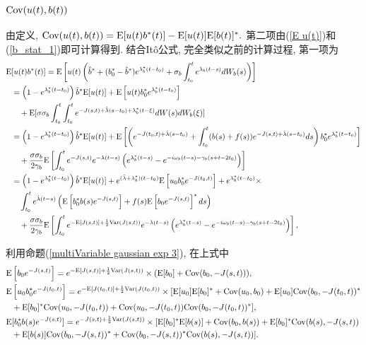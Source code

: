 \documentclass[notitlepage,cs4size,punct,oneside]{ctexrep}
\numberwithin{equation}{section}
\theoremstyle{mystyle}
\begin{document}
\subsubsection{$\text{Cov}(u(t), b(t))$}
由定义,
$
\text{Cov}(u(t), b(t)) = \text{E}[u(t)b^*(t)] - \text{E}[u(t)]\text{E}[b(t)]^*.
$
第二项由(\ref{E u(t)})和(\ref{b_stat_1})即可计算得到. 结合It\^o公式, 完全类似之前的计算过程, 第一项为
\[
\begin{split}
\text{E}&[u(t)b^*(t)] = \text{E}\left[u(t)\left(\hat{b}^*+(b_0^*-\hat{b}^*)e^{\lambda_b^*(t-t_0)}+\sigma_b\int_{t_0}^t e^{\lambda_b(t-s)}dW_b(s)\right)\right] \\
&= \left(1-e^{\lambda_b^*(t-t_0)}\right)\hat{b}^*\text{E}[u(t)] + \text{E}\left[u(t)b_0^*e^{\lambda_b^*(t-t_0)}\right] \\
&\quad + \text{E}[\sigma\sigma_b\int_{t_0}^t\int_{t_0}^te^{-J(s, t)+\hat\lambda(s-t_0)+\lambda_b^*(t-\xi)}dW(s)dW_b(\xi)] \\
&= \left(1-e^{\lambda_b^*(t-t_0)}\right)\hat{b}^*\text{E}[u(t)] + \text{E}\left[\left(e^{-J(t_0, t)+\hat\lambda(s-t_0)}+\int_{t_0}^t (b(s)+f(s))e^{-J(s, t)+\hat\lambda(s-t_0)}ds\right)b_0^*e^{\lambda_b^*(t-t_0)}\right] \\
&\quad + \frac{\sigma\sigma_b}{2\gamma_b}\text{E}\left[\int_{t_0}^t e^{-J(s, t)}e^{-\lambda(t-s)}\left(e^{\lambda_b^*(t-s)}-e^{-i\omega_b(t-s)-\gamma_b(s+t-2t_0)}\right)\right] \\
&= \left(1-e^{\lambda_b^*(t-t_0)}\right)\hat{b}^*\text{E}[u(t)] + e^{(\hat\lambda+\lambda_b^*)(t-t_0)}\text{E}\left[u_0b_0^*e^{-J(t_0, t)}\right] + e^{\lambda_b^*(t-t_0)}\times \\
&\quad \int_{t_0}^t e^{\hat\lambda(t-s)}\left(\text{E}\left[b_0^*b(s)e^{-J(s, t)}\right]+f(s)\text{E}\left[b_0e^{-J(s, t)}\right]^*ds\right) \\
&\quad + \frac{\sigma\sigma_b}{2\gamma_b}\text{E}\left[\int_{t_0}^t e^{-\text{E}[J(s, t)]+\frac{1}{2}\text{Var}(J(s, t))}e^{-\lambda(t-s)}\left(e^{\lambda_b^*(t-s)}-e^{-i\omega_b(t-s)-\gamma_b(s+t-2t_0)}\right)\right],
\end{split}
\]

利用命题(\ref{multiVariable gaussian exp 3}), 在上式中
\[
\begin{split}
\text{E}&\left[b_0e^{-J(s, t)}\right] = e^{-\text{E}[J(s, t)]+\frac{1}{2}\text{Var}(J(s, t))}\times(\text{E}[b_0]+\text{Cov}(b_0, -J(s, t))), \\
\text{E}&\left[u_0b_0^*e^{-J(t_0, t)}\right] = e^{-\text{E}[J(t_0, t)]+\frac{1}{2}\text{Var}(J(t_0, t))}\times[\text{E}[u_0]\text{E}[b_0]^*+\text{Cov}(u_0, b_0)+\text{E}[u_0]\text{Cov}(b_0, -J(t_0, t))^*\\
&+\text{E}[b_0]^*\text{Cov}(u_0, -J(t_0, t)) + \text{Cov}(u_0, -J(t_0, t))\text{Cov}(b_0, -J(t_0, t))^*], \\
\text{E}&[b_0^*b(s)e^{-J(s, t)}] = e^{-J(s, t)+\frac{1}{2}\text{Var}(J(s, t))}\times [\text{E}[b_0]^*\text{E}[b(s)]+\text{Cov}(b_0, b(s))+\text{E}[b_0]^*\text{Cov}(b(s), -J(s, t))\\
&+\text{E}[b(s)]\text{Cov}(b_0, -J(s, t))^*+\text{Cov}(b_0, -J(s, t))^*\text{Cov}(b(s), -J(s, t))].
\end{split}
\]
\end{document}
